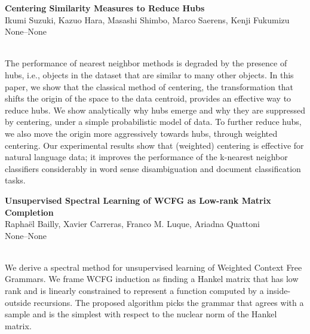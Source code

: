 \documentclass[twoside,makeidx]{book}
\begin{document}
\par\vspace{2em}\noindent%
\begin{minipage}{\linewidth}%
\begin{center}
\textbf{\normalsize Centering Similarity Measures to Reduce Hubs}\\
\normalsize  Ikumi Suzuki,  Kazuo Hara,  Masashi Shimbo,  Marco Saerens,  Kenji Fukumizu\\
{\small None--None}\\
\end{center}
\end{minipage}\\[0.5em]
\nopagebreak%
\noindent%
{\small The performance of nearest neighbor methods is degraded by the presence of hubs, i.e., objects in the dataset that are similar to many other objects. In this paper, we show that the classical method of centering, the transformation that shifts the origin of the space to the data centroid, provides an effective way to reduce hubs. We show analytically why hubs emerge and why they are suppressed by centering, under a simple probabilistic model of data. To further reduce hubs, we also move the origin more aggressively towards hubs, through weighted centering. Our experimental results show that (weighted) centering  is effective for natural language data; it improves the performance of the k-nearest neighbor classifiers considerably in word sense disambiguation and document classification tasks.}
\par\vspace{2em}\noindent%
\begin{minipage}{\linewidth}%
\begin{center}
\textbf{\normalsize Unsupervised Spectral Learning of WCFG as Low-rank Matrix Completion}\\
\normalsize  Rapha\"{e}l Bailly,  Xavier Carreras,  Franco M. Luque,  Ariadna Quattoni\\
{\small None--None}\\
\end{center}
\end{minipage}\\[0.5em]
\nopagebreak%
\noindent%
{\small We derive a spectral method for unsupervised learning of Weighted Context Free Grammars. We frame WCFG induction as finding a Hankel matrix that has low rank and is linearly constrained to represent a function computed by a inside-outside recursions. The proposed algorithm picks the grammar that agrees with a sample and is the simplest with respect to the nuclear norm of the Hankel matrix.}
\end{document}
